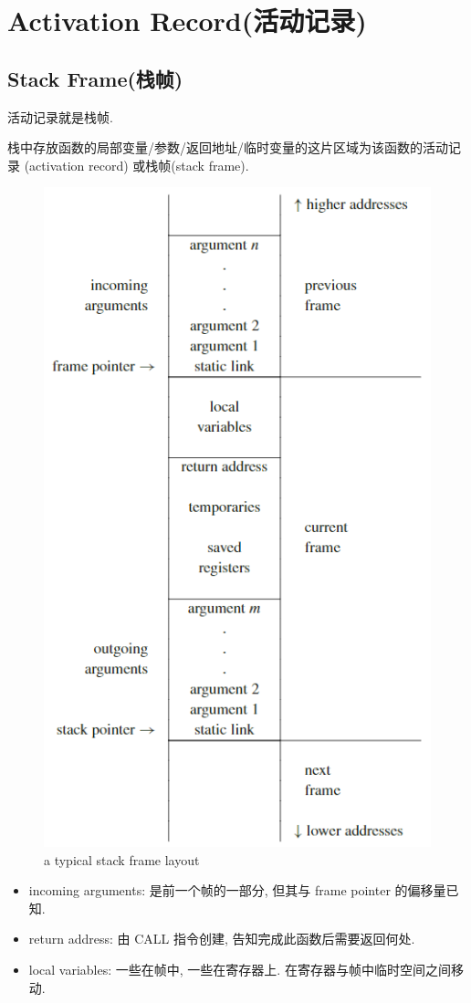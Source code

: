 \section{Activation Record(活动记录)}
\subsection{Stack Frame(栈帧)}
活动记录就是栈帧. 

\begin{definition}
    栈中存放函数的局部变量/参数/返回地址/临时变量的这片区域为该函数的活动记录 (activation record) 或栈帧(stack frame).
\end{definition}
\begin{figure}[H]
    \centering
    \includegraphics[width=0.6\linewidth]{pic/CP678/a typical stack frame layout.png}
    \caption{a typical stack frame layout}
\end{figure}
\begin{itemize}
    \item incoming arguments: 是前一个帧的一部分, 但其与 frame pointer 的偏移量已知.
    \item return address: 由 CALL 指令创建, 告知完成此函数后需要返回何处.
    \item local variables: 一些在帧中, 一些在寄存器上. 在寄存器与帧中临时空间之间移动.
\end{itemize}


